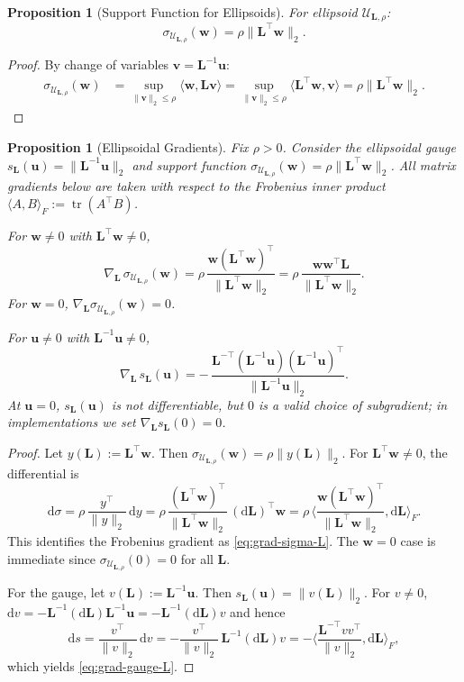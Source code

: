 \documentclass[lettersize,journal]{IEEEtran}
\newcommand{\cU}{\mathcal{U}}
\newcommand{\ip}[2]{\langle #1, #2 \rangle}
\newcommand{\norm}[1]{\|#1\|}
\newcommand{\bu}{\bm{u}}
\newcommand{\bw}{\bm{w}}
\newcommand{\bL}{\bm{L}}
\DeclareMathOperator{\tr}{tr}
\newcommand{\ipF}[2]{\langle #1, #2 \rangle_F} %
\newtheorem{proposition}[theorem]{Proposition}
\theoremstyle{definition}
\begin{document}
\begin{proposition}[Support Function for Ellipsoids]
For ellipsoid $\cU_{\bL,\rho}$:
\begin{equation}\label{eq:ellipsoid-support}
\sigma_{\cU_{\bL,\rho}}(\bw) = \rho \norm{\bL^\top \bw}_2.
\end{equation}
\end{proposition}

\begin{proof}
By change of variables $\bm{v} = \bL^{-1}\bu$:
\begin{align}
\sigma_{\cU_{\bL,\rho}}(\bw) &= \sup_{\norm{\bm{v}}_2 \leq \rho} \ip{\bw}{\bL\bm{v}} = \sup_{\norm{\bm{v}}_2 \leq \rho} \ip{\bL^\top\bw}{\bm{v}} = \rho \norm{\bL^\top\bw}_2.
\end{align}
\end{proof}

\begin{proposition}[Ellipsoidal Gradients]\label{prop:ellipsoid-grads}
Fix $\rho>0$. Consider the ellipsoidal gauge $s_{\bL}(\bu)=\|\bL^{-1}\bu\|_2$ and support function
$\sigma_{\cU_{\bL,\rho}}(\bw)=\rho\|\bL^\top\bw\|_2$.
All matrix gradients below are taken with respect to the Frobenius inner product
$\ipF{A}{B}:=\tr(A^\top B)$.

For $\bw\neq 0$ with $\bL^\top\bw\neq 0$,
\begin{equation}\label{eq:grad-sigma-L}
\nabla_{\bL}\,\sigma_{\cU_{\bL,\rho}}(\bw)
=\rho\,\frac{\bw(\bL^\top\bw)^\top}{\|\bL^\top\bw\|_2}
=\rho\,\frac{\bw\bw^\top\bL}{\|\bL^\top\bw\|_2}.
\end{equation}
For $\bw=0$, $\nabla_{\bL}\sigma_{\cU_{\bL,\rho}}(\bw)=0$.

For $\bu\neq 0$ with $\bL^{-1}\bu\neq 0$,
\begin{equation}\label{eq:grad-gauge-L}
\nabla_{\bL}\,s_{\bL}(\bu)
=-\,\frac{\bL^{-\top}(\bL^{-1}\bu)(\bL^{-1}\bu)^\top}{\|\bL^{-1}\bu\|_2}.
\end{equation}
At $\bu=0$, $s_{\bL}(\bu)$ is not differentiable, but $0$ is a valid choice of subgradient; in implementations we set $\nabla_{\bL}s_{\bL}(0)=0$.
\end{proposition}

\begin{proof}
Let $y(\bL):=\bL^\top\bw$. Then $\sigma_{\cU_{\bL,\rho}}(\bw)=\rho\|y(\bL)\|_2$.
For $\bL^\top\bw\neq 0$, the differential is
\[
\mathrm{d}\sigma
=\rho\,\frac{y^\top}{\|y\|_2}\,\mathrm{d}y
=\rho\,\frac{(\bL^\top\bw)^\top}{\|\bL^\top\bw\|_2}\,(\mathrm{d}\bL)^\top\bw
=\rho\,\ipF{\frac{\bw(\bL^\top\bw)^\top}{\|\bL^\top\bw\|_2}}{\mathrm{d}\bL}.
\]
This identifies the Frobenius gradient as \eqref{eq:grad-sigma-L}.
The $\bw=0$ case is immediate since $\sigma_{\cU_{\bL,\rho}}(0)=0$ for all $\bL$.

For the gauge, let $v(\bL):=\bL^{-1}\bu$. Then $s_{\bL}(\bu)=\|v(\bL)\|_2$.
For $v\neq 0$, $\mathrm{d}v = -\bL^{-1}(\mathrm{d}\bL)\bL^{-1}\bu = -\bL^{-1}(\mathrm{d}\bL)v$ and hence
\[
\mathrm{d}s
=\frac{v^\top}{\|v\|_2}\,\mathrm{d}v
=-\frac{v^\top}{\|v\|_2}\,\bL^{-1}(\mathrm{d}\bL)v
=-\ipF{\frac{\bL^{-\top}vv^\top}{\|v\|_2}}{\mathrm{d}\bL},
\]
which yields \eqref{eq:grad-gauge-L}.
\end{proof}
\end{document}
